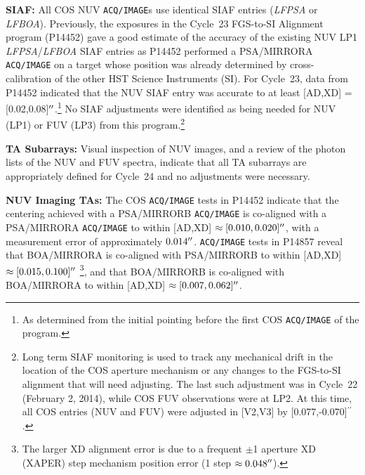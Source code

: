 \documentclass[12pt]{reportj}
\def\arcsec{\hbox{$^{\prime\prime}$}}
\newcommand{\pid}[1]{{\rm P}#1}
\newcommand{\tacq}[1]{\texttt{ACQ/#1}}
\begin{document}
\begin{description}
\item{\bf SIAF:}{
	All COS NUV \tacq{IMAGE}s use identical SIAF entries ({\it LFPSA} or {\it LFBOA}).
	Previously, the exposures in the Cycle~23 FGS-to-SI Alignment program (\pid{14452}) gave a good estimate of the accuracy of the existing NUV LP1 {\it LFPSA}/{\it LFBOA} SIAF entries
	as \pid{14452} performed a PSA/MIRRORA \tacq{IMAGE} on a target whose position was already determined by cross-calibration of the other HST Science Instruments (SI).
	For Cycle~23, data from \pid{14452} indicated that the NUV SIAF entry was accurate to at least [AD,XD] = [0.02,0.08]$\arcsec$.\footnote{As determined from the initial pointing before the first COS \tacq{IMAGE} of the program.}
	No SIAF adjustments were identified as being needed for NUV (LP1) or FUV (LP3) from this program.\footnote{Long term SIAF monitoring is used to track any mechanical drift in the location of the COS aperture mechanism or any changes to the FGS-to-SI alignment that will need adjusting.
	The last such adjustment was in Cycle~22 (February 2, 2014), while COS FUV observations were at LP2. At this time, all COS entries (NUV and FUV) were adjusted in [V2,V3] by [0.077,-0.070]\arcsec. }
}
\item{\bf TA Subarrays:} Visual inspection of NUV images, and a review of the photon lists of the NUV and FUV spectra, indicate that all TA subarrays are appropriately defined for Cycle~24 and no adjustments were necessary.
\item{\bf NUV Imaging TAs:}
	The COS \tacq{IMAGE} tests in \pid{14452} indicate that the centering achieved with a PSA/MIRRORB \tacq{IMAGE} is co-aligned with a PSA/MIRRORA \tacq{IMAGE} to within [AD,XD] $\approx [0.010,0.020]\arcsec$, with a measurement error of approximately $0.014\arcsec$.
	\tacq{IMAGE} tests in \pid{14857} reveal that BOA/MIRRORA is co-aligned with PSA/MIRRORB to within [AD,XD] $\approx [0.015,0.100]\arcsec$
	\footnote{The larger XD alignment error is due to a frequent $\pm$1 aperture XD (XAPER) step mechanism position error (1 step $\approx 0.048\arcsec$).}, and that BOA/MIRRORB is co-aligned with BOA/MIRRORA to within [AD,XD] $\approx [0.007,0.062]\arcsec$.


\end{description}
\end{document}
